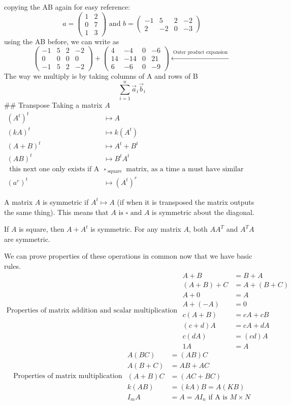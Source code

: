 copying the AB again for easy reference:
$$
a = \begin{pmatrix}
1 & 2  \\
0 & 7  \\
1 & 3
\end{pmatrix} \text{ and }  b = \begin{pmatrix}
-1 & 5 & 2 & -2 \\
2 & -2 & 0 & -3
\end{pmatrix}
$$
using the AB before, we can write as
$$
\begin{pmatrix}
-1 & 5 & 2 & -2 \\
0 & 0 & 0 & 0 \\
-1 & 5 & 2 & -2
\end{pmatrix} + \begin{pmatrix}
4 & -4 & 0 & -6 \\
14 & -14  & 0 & 21 \\
6 & -6 & 0 & -9
\end{pmatrix} \xleftarrow {\text{ Outer product expansion }}
$$
The way we multiply is by taking columns of A and rows of B
$$
\sum_{i=1}^{n}\vec{a}_{i}\vec{b}_{i}
$$ 
## Transpose
Taking a matrix $A$
$$
\begin{align}
(A^{t})^{t}&\mapsto A \\
(kA)^{t} &\mapsto k(A^{t})  \\
(A+B)^{t} &\mapsto A^{t}+B^{t} \\
(AB)^{t} &\mapsto B^{t}A^{t}  \\
\text{ this next one only exists if A is a } &\square_{\text{ square }} \text{ matrix, as a time a must have similar dimenisions } \\


(a^{r})^{t}&\mapsto (A^{t})^{r}
\end{align}
$$

A matrix $A$ is symmetric if $A^{t} \mapsto A$ (if when it is transposed the matrix outputs the same thing). This means that $A\text{ is } \square \text{ and } A$ is symmetric about the diagonal.

If $A$ is square, then $A+A^{t}$ is symmetric. For any matrix $A$, both $AA^{T}$ and $A^{T}A$ are symmetric. 

We can prove properties of these operations in common now that we have basic rules.
$$\text{ Properties of matrix addition and scalar multiplication }
\begin{align}
A+B&=B+A \\
(A+B)+C&=A+(B+C) \\
A+0&=A \\
A+(-A) &= 0 \\
c(A+B)&=cA+cB \\
(c+d)A&=cA+dA \\
c(dA)&=(cd)A \\
1A&=A
\end{align}
$$
$$
\text{ Properties of matrix multiplication   }
\begin{align}
A(BC)&=(AB)C \\
A(B+C)&=AB+AC \\
(A+B)C&=(AC+BC) \\
k(AB)&=(kA)B=A(KB) \\
I_{m}A&=A=AI_{n} \text{ if A is }M\times N
\end{align}
$$

